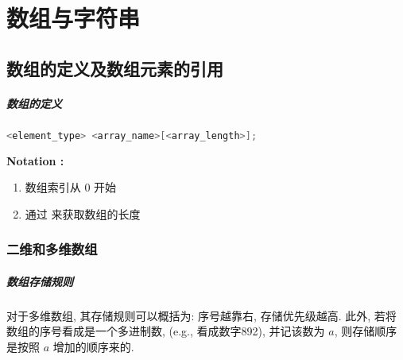 \chapter{数组与字符串}
\section{数组的定义及数组元素的引用}
    \paragraph{数组的定义}
        \begin{lstlisting}[language = {C}, gobble = 12]
            <element_type> <array_name>[<array_length>];
        \end{lstlisting}
    \textbf{Notation :}
    \begin{enumerate}
        \item 数组索引从 0 开始
        \item 通过  来获取数组的长度
    \end{enumerate}

    \subsection{二维和多维数组}
    \paragraph{数组存储规则}
        对于多维数组, 其存储规则可以概括为: 序号越靠右, 存储优先级越高. 此外, 若将数组的序号看成是一个多进制数, (e.g., \Code{[8][9][2]} 看成数字892), 并记该数为 $a$, 则存储顺序是按照 $a$ 增加的顺序来的.
